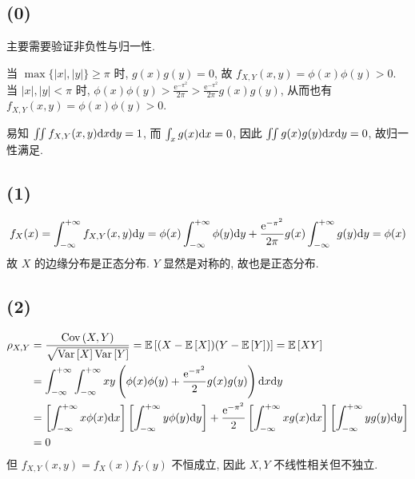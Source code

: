 \documentclass[8pt]{article}
\theoremstyle{compact}
\def\ge{\geqslant}
\def\e{\mathrm{e}}
\def\E#1{\mathbb{E}\left[{#1}\right]}
\def\Var#1{\text{Var}\left[{#1}\right]}
\def\Cov#1{\text{Cov}\left({#1}\right)}
\begin{document}
\section{}
\subsection*{(0)}
主要需要验证非负性与归一性.

当 $\max\{|x|, |y|\} \ge \pi$ 时, $g(x)g(y) = 0$, 故 $f_{X, Y}(x, y) = \phi(x)\phi(y) > 0$. 当 $|x|, |y| < \pi$ 时, $\phi(x)\phi(y) > \frac{\e^{-\pi^2}}{2\pi} > \frac{\e^{-\pi^2}}{2\pi}g(x)g(y)$, 从而也有$f_{X, Y}(x, y) = \phi(x)\phi(y) > 0$. 

易知 $\iint f_{X, Y}(x, y)\text dx \text dy = 1$, 而 $\int_x g(x)\text dx = 0$, 因此 $\iint g(x)g(y)\text dx \text dy = 0$, 故归一性满足.

\subsection*{(1)}
\begin{equation*}
	f_X(x) = \int_{-\infty}^{+\infty}f_{X, Y}(x, y)\text dy = \phi(x)\int_{-\infty}^{+\infty}\phi(y)\text dy + \frac{\e^{-\pi^2}}{2\pi}g(x)\int_{-\infty}^{+\infty}g(y)\text dy = \phi(x)
\end{equation*}
故 $X$ 的边缘分布是正态分布. $Y$ 显然是对称的, 故也是正态分布.

\subsection*{(2)}
\begin{equation*}
	\begin{split}	
	\rho_{X, Y} &= \frac{\Cov{X, Y}}{\sqrt{\Var{X}\Var{Y}}} = \E{(X - \E{X})(Y - \E{Y})} = \E{XY}\\
	&= \int_{-\infty}^{+\infty}\int_{-\infty}^{+\infty} xy \left(\phi(x)\phi(y) + \frac{\e^{-\pi^2}}{2}g(x)g(y)\right)\text dx \text dy\\
	&= \left[\int_{-\infty}^{+\infty}x\phi(x)\text dx\right]\left[\int_{-\infty}^{+\infty}y\phi(y)\text dy\right] + \frac{\e^{-\pi^2}}{2}\left[\int_{-\infty}^{+\infty}x g(x)\text dx\right]\left[\int_{-\infty}^{+\infty}y g(y)\text dy\right]\\ &=0
	\end{split}
\end{equation*}
但 $f_{X, Y}(x, y) = f_X(x)f_Y(y)$ 不恒成立, 因此 $X, Y$ 不线性相关但不独立.

\section{}
\end{document}

